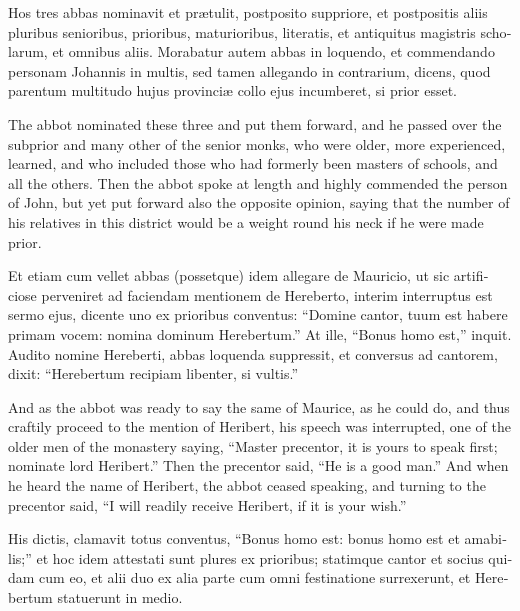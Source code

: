 \documentclass[10pt]{book}
\begin{document}
\begin{paracol}{2}
\switchcolumn*

\begin{otherlanguage}{latin}
Hos tres abbas nominavit et pr\ae{}tulit, postposito suppriore, et postpositis aliis pluribus senioribus, prioribus, maturioribus, literatis, et antiquitus magistris scholarum, et omnibus aliis. Morabatur autem abbas in loquendo, et commendando personam Johannis in multis, sed tamen allegando in contrarium, dicens, quod parentum multitudo hujus provinci\ae{} collo ejus incumberet, si prior esset. 
\end{otherlanguage}

\switchcolumn

The abbot nominated these three and put them forward, and he passed over the subprior and many other of the senior monks, who were older, more experienced, learned, and who included those who had formerly been masters of schools, and all the others. Then the abbot spoke at length and highly commended the person of John, but yet put forward also the opposite opinion, saying that the number of his relatives in this district would be a weight round his neck if he were made prior.

\switchcolumn*

\begin{otherlanguage}{latin}
Et etiam cum vellet abbas (possetque) idem allegare de Mauricio, ut sic artificiose perveniret ad faciendam mentionem de Hereberto, interim interruptus est sermo ejus, dicente uno ex prioribus conventus: ``Domine cantor, tuum est habere primam vocem: nomina dominum Herebertum.'' At ille, ``Bonus homo est,'' inquit. Audito nomine Hereberti, abbas loquenda suppressit, et conversus ad cantorem, dixit: ``Herebertum recipiam libenter, si vultis.''
\end{otherlanguage}

\switchcolumn

And as the abbot was ready to say the same of Maurice, as he could do, and thus craftily proceed to the mention of Heribert, his speech was interrupted, one of the older men of the monastery saying, ``Master precentor, it is yours to speak first; nominate lord Heribert.'' Then the precentor said, ``He is a good man.'' And when he heard the name of Heribert, the abbot ceased speaking, and turning to the precentor said, ``I will readily receive Heribert, if it is your wish.''

\switchcolumn*

\begin{otherlanguage}{latin}
His dictis, clamavit totus conventus, ``Bonus homo est: bonus homo est et amabilis;'' et hoc idem attestati sunt plures ex prioribus; statimque cantor et socius quidam cum eo, et alii duo ex alia parte cum omni festinatione surrexerunt, et Herebertum statuerunt in medio.
\end{otherlanguage}


\end{paracol}
\end{document}
